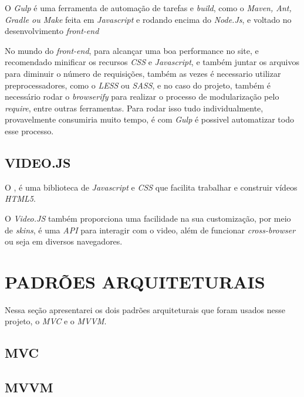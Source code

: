 O \textit{Gulp} é uma ferramenta de automação de tarefas e \textit{build}, como o \textit{Maven, Ant, Gradle ou Make} feita em \textit{Javascript} e rodando encima do \textit{Node.Js}, e voltado no desenvolvimento \textit{front-end} \cite{souza-gulp}
\par
No mundo do \textit{front-end}, para alcançar uma boa performance no site, e recomendado minificar os recursos \textit{CSS} e \textit{Javascript}, e também juntar os arquivos para diminuir o número de requisições, também as vezes é necessario utilizar preprocessadores, como o \textit{LESS} ou \textit{SASS}, e no caso do projeto, também é necessário rodar o \textit{browserify} para realizar o processo de modularização pelo \textit{require}, entre outras ferramentas. Para rodar isso tudo individualmente, provavelmente consumiria muito tempo, é com \textit{Gulp} é possivel automatizar todo esse processo.

\subsection{VIDEO.JS}
O , é uma biblioteca de \textit{Javascript} e \textit{CSS} que facilita trabalhar e construir vídeos \textit{HTML5}.
\par
O \textit{Video.JS} também proporciona uma facilidade na sua customização, por meio de \textit{skins}, é uma \textit{API} para interagir com o video, além de funcionar \textit{cross-browser} ou seja em diversos navegadores.


\section{PADRÕES ARQUITETURAIS}
Nessa seção apresentarei os dois padrões arquiteturais que foram usados nesse projeto, o \textit{MVC} e o \textit{MVVM}.

\subsection{MVC}

\subsection{MVVM}